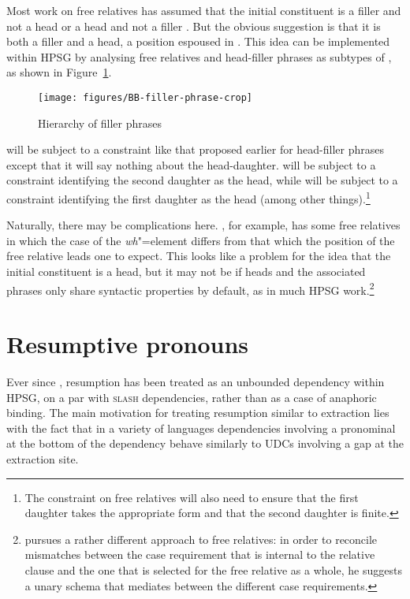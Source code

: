 \documentclass[output=paper
,notxmath 
 	        ,biblatex
                ,babelshorthands
                ,newtxmath
                ,draftmode
                ,colorlinks, citecolor=brown
]{langscibook}
\begin{document}
Most work on free relatives has assumed that the initial constituent is a filler and not a head
\citep{Groos:Riemsdijk:81,Grosu:2003} or a head and not a filler
\citep{Bresnan:Grimshaw:78}. But the obvious suggestion is that it is
both a filler and a head, a position espoused in
\citet[Chapter~12.6]{Huddleston02}. This idea can be implemented within HPSG by
analysing free relatives and head-filler phrases as subtypes of
, as shown in Figure~\ref{fig:UDC:67}.


\begin{figure}
  \centering

  \texttt{[image: figures/BB-filler-phrase-crop]}
  \caption{\label{fig:UDC:67}Hierarchy of filler phrases}
  
\end{figure}

\noindent
{} will be subject to a constraint like that proposed earlier
for head-filler phrases except that it will say nothing about the
head-daughter.  will be subject to a constraint
identifying the second daughter as the head, while  will
be subject to a constraint identifying the first daughter as the head
(among other things).\footnote{The constraint on free relatives will also
  need to ensure that the first daughter takes the appropriate form and
  that the second daughter is finite.}

Naturally, there may be complications here. , for example, has
some free relatives in which the case of the \emph{wh}"=element differs from
that which the position of the free relative leads one to expect. This
looks like a problem for the idea that the initial constituent is a
head, but it may not be if heads and the associated phrases only share
syntactic properties by default, as in much HPSG
work.\footnote{\citet{Mueller:99a} pursues a rather different approach
  to free relatives: in order to reconcile 
mismatches between the case requirement that is internal to the relative
clause and the one that is selected for the free relative as a whole,
he suggests a unary schema that mediates between the
different case requirements.}%

\section{Resumptive pronouns}
\label{sec:UDC:ResumptivePronouns}

Ever since \citet{Vaillette:01}, resumption has been treated as an
unbounded dependency within HPSG, on a par with \textsc{slash}
dependencies, rather than as a case of anaphoric binding. The main
motivation for treating resumption similar to extraction lies with the
fact that in a variety of languages dependencies involving a
pronominal at the bottom of the dependency behave similarly to UDCs
involving a gap at the extraction site.
\end{document}
